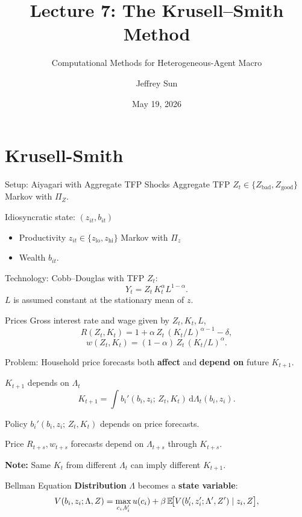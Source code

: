 \documentclass[10pt,aspectratio=169]{beamer}
\title{Lecture 7: The Krusell--Smith Method}
\subtitle{Computational Methods for Heterogeneous-Agent Macro}
\author{Jeffrey Sun}
\institute{University of Toronto}
\date{May 19, 2026}
\begin{document}
\maketitle

\section{Krusell-Smith}

\begin{frame}{Setup: Aiyagari with Aggregate TFP Shocks}
  Aggregate TFP $Z_t \in \{Z_{\text{bad}}, Z_{\text{good}}\}$ Markov  with $\Pi_Z$.

  Idiosyncratic state: $(z_{it}, b_{it})$
  \begin{itemize}
    \item Productivity $z_{it} \in \{z_{\text{lo}}, z_{\text{hi}}\}$ Markov with $\Pi_z$
    \item Wealth $b_{it}$.
  \end{itemize}

  Technology: Cobb--Douglas with TFP $Z_t$:
  \[
    Y_t = Z_t\, K_t^{\alpha} L^{1-\alpha}.
  \]
  $L$ is assumed constant at the stationary mean of $z$.
\end{frame}

\begin{frame}{Prices}
  Gross interest rate and wage given by $Z_t, K_t, L$,
  \[
    R(Z_t, K_t) = 1 + \alpha\, Z_t\, (K_t/L)^{\alpha-1} - \delta,
  \]
  \[
    w(Z_t, K_t) = (1-\alpha)\, Z_t\, (K_t/L)^{\alpha}.
  \]

  Problem: Household price forecasts both \textbf{affect} and \textbf{depend on} future $K_{t+1}$.
\end{frame}

\begin{frame}{$K_{t+1}$ depends on $\Lambda_t$}
  \[
    K_{t+1} = \int b_i'(b_i, z_i;\, Z_t, K_t)\, \mathrm d\Lambda_t(b_i, z_i).
  \]

  Policy $b_i'(b_i, z_i;\, Z_t, K_t)$ depends on price forecasts.

  Price $R_{t+s}, w_{t+s}$ forecasts depend on $\Lambda_{t+s}$ through $K_{t+s}$.

  \textbf{Note:} Same $K_t$ from different $\Lambda_t$ can imply different $K_{t+1}$.
\end{frame}

\begin{frame}{Bellman Equation}
  \textbf{Distribution} $\Lambda$ becomes a \textbf{state variable}:
  \[
    V(b_i, z_i; \Lambda, Z) = \max_{c_i, b_i'} u(c_i) + \beta\, \mathbb{E}\!\bigl[V(b_i', z_i'; \Lambda', Z') \mid z_i, Z\bigr],
  \]
\end{frame}
\end{document}
